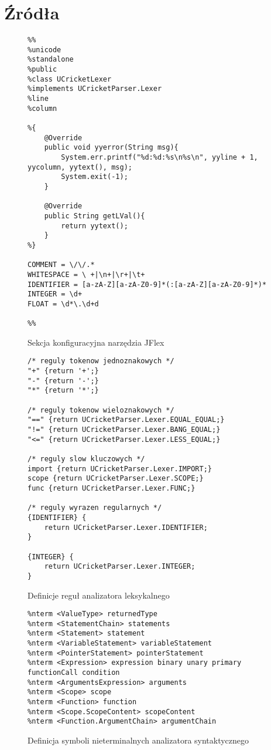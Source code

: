 \chapter{Źródła}
\begin{figure}
\begin{lstlisting}
%%
%unicode
%standalone
%public
%class UCricketLexer
%implements UCricketParser.Lexer
%line
%column

%{
    @Override
    public void yyerror(String msg){
        System.err.printf("%d:%d:%s\n%s\n", yyline + 1, yycolumn, yytext(), msg);
        System.exit(-1);
    }

    @Override
    public String getLVal(){
        return yytext();
    }
%}

COMMENT = \/\/.*
WHITESPACE = \ +|\n+|\r+|\t+
IDENTIFIER = [a-zA-Z][a-zA-Z0-9]*(:[a-zA-Z][a-zA-Z0-9]*)*
INTEGER = \d+
FLOAT = \d*\.\d+d

%%
\end{lstlisting}
\caption{Sekcja konfiguracyjna narzędzia JFlex}
\label{fig:lst:lexer-konfiguracja}
\end{figure}

\begin{figure}
\begin{lstlisting}
/* reguly tokenow jednoznakowych */
"+" {return '+';}
"-" {return '-';}
"*" {return '*';}

/* reguly tokenow wieloznakowych */
"==" {return UCricketParser.Lexer.EQUAL_EQUAL;}
"!=" {return UCricketParser.Lexer.BANG_EQUAL;}
"<=" {return UCricketParser.Lexer.LESS_EQUAL;} 

/* reguly slow kluczowych */
import {return UCricketParser.Lexer.IMPORT;}
scope {return UCricketParser.Lexer.SCOPE;}
func {return UCricketParser.Lexer.FUNC;}

/* reguly wyrazen regularnych */
{IDENTIFIER} {
    return UCricketParser.Lexer.IDENTIFIER;
}

{INTEGER} {
    return UCricketParser.Lexer.INTEGER;
}
\end{lstlisting}
\caption{Definicje reguł analizatora leksykalnego}
\label{fig:lst:lexer-reguły}
\end{figure}

\begin{figure}
\begin{lstlisting}
%nterm <ValueType> returnedType
%nterm <StatementChain> statements
%nterm <Statement> statement
%nterm <VariableStatement> variableStatement
%nterm <PointerStatement> pointerStatement
%nterm <Expression> expression binary unary primary functionCall condition
%nterm <ArgumentsExpression> arguments
%nterm <Scope> scope
%nterm <Function> function
%nterm <Scope.ScopeContent> scopeContent
%nterm <Function.ArgumentChain> argumentChain
\end{lstlisting}
\caption{Definicja symboli nieterminalnych analizatora syntaktycznego}
\label{fig:lst:parser-nterms}
\end{figure}

